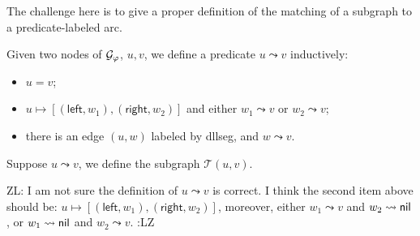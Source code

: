 \documentclass{llncs}
\newcommand{\zhilin}[1]{\color{red} {ZL: #1 :LZ} \color{black}}
\begin{document}
The challenge here is to give a proper definition of the matching of a subgraph to a predicate-labeled arc.

\begin{definition}
Given two nodes of $\mathcal{G}_\varphi$, $u, v$, we define  a predicate $u\leadsto v$ inductively:
\begin{itemize}
\item $u=v$;
\item $u\mapsto [(\mathsf{left}, w_1), (\mathsf{right}, w_2) ]$ and either $w_1\leadsto v$ or $w_2\leadsto v$;
\item there is an edge $(u,w)$ labeled by dllseg, and $w\leadsto v$.
\end{itemize}

Suppose $u\leadsto v$, we define the subgraph $\mathcal{T}(u,v)$.
\end{definition}
\zhilin{I am not sure the definition of $u \leadsto v$ is correct. I think the second item above should be: $u \mapsto [(\mathsf{left}, w_1), (\mathsf{right}, w_2) ]$, moreover, either $w_1 \leadsto v$ and $w_2 \leadsto {\sf nil}$, or $w_1 \leadsto {\sf nil}$ and $w_2 \leadsto v$.}
\end{document}
